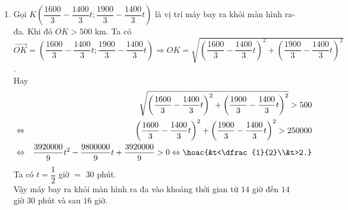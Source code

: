\begin{bt}
{\begin{enumerate}
			Suy ra $H(-50;50)$. Do đó $OH=50\sqrt{2}$.\\
			Ta có $t=\dfrac{5}{4}$ giờ $=$ 1 giờ 15 phút. \\
			Vậy máy bay bay gần đài kiểm soát không lưu nhất lúc: 14 giờ +1 giờ 15 phút=15 giờ 15 phút và khoảng cách giữa máy bay và đài kiểm soát không lưu lúc này là $50\sqrt{2}$ km. 
			\item Gọi $K\left(\dfrac{1600}{3}-\dfrac{1400}{3}t;\dfrac{1900}{3}-\dfrac{1400}{3}t\right)$ là vị trí máy bay ra khỏi màn hình ra-đa. Khi đó $OK>500$ km. Ta có\\ $\overrightarrow{OK}=\left(\dfrac{1600}{3}-\dfrac{1400}{3}t;\dfrac{1900}{3}-\dfrac{1400}{3}t\right)\Rightarrow OK=\sqrt{\left(\dfrac{1600}{3}-\dfrac{1400}{3}t\right)^2+\left(\dfrac{1900}{3}-\dfrac{1400}{3}t\right)^2}$.\\
			Hay 
			\begin{eqnarray*}
				& & \sqrt{\left(\dfrac{1600}{3}-\dfrac{1400}{3}t\right)^2+\left(\dfrac{1900}{3}-\dfrac{1400}{3}t\right)^2}>500\\
				&\Leftrightarrow& \left(\dfrac{1600}{3}-\dfrac{1400}{3}t\right)^2+\left(\dfrac{1900}{3}-\dfrac{1400}{3}t\right)^2>250000\\
				&\Leftrightarrow& \dfrac{3920000}{9}t^2-\dfrac{9800000}{9}t+\dfrac{3920000}{9}>0
				\Leftrightarrow \hoac{&t<\dfrac{1}{2}\\&t>2.}
			\end{eqnarray*} 
			Ta có $t=\dfrac{1}{2}$ giờ $=$ $30$ phút.\\
			Vậy máy bay ra khỏi màn hình ra đa vào khoảng thời gian từ $14$ giờ đến $14$ giờ $30$ phút và sau $16$ giờ.
		\end{enumerate}
		
	}
\end{bt}

